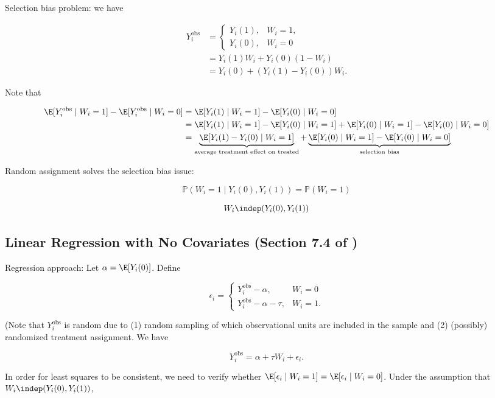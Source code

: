 Selection bias problem: we have

\begin{align*}
Y_i^{\text{obs}} & = \begin{cases}Y_i(1), & W_i = 1, \\ Y_i(0), & W_i = 0 \end{cases}
\\ & = Y_i(1) W_i + Y_i(0) (1 - W_i) 
\\ & = Y_i(0) + (Y_i(1) - Y_i(0)) W_i.
\end{align*}

Note that

\begin{align*}
\E[Y_i^{\text{obs}} \mid W_i = 1] -  \E[Y_i^{\text{obs}} \mid W_i = 0] &  =   \E[Y_i(1)  \mid W_i = 1] -  \E[Y_i(0) \mid W_i = 0] 
\\ &  =   \E[Y_i(1)  \mid W_i = 1] - \E[Y_i(0)  \mid W_i = 1]  + \E[Y_i(0)  \mid W_i = 1]  -  \E[Y_i(0) \mid W_i = 0] 
\\ &  =  \underbrace{\E[Y_i(1) - Y_i(0) \mid W_i = 1] }_{\text{average treatment effect on treated}} +  \underbrace{ \E[Y_i(0) \mid W_i = 1]  -  \E[Y_i(0) \mid W_i = 0]}_{\text{selection bias}} 
\end{align*}

Random assignment solves the selection bias issue:

\[
\mathbb{P}(W_i = 1 \mid Y_i(0), Y_i(1)) = \mathbb{P}(W_i = 1)
\]

\[
W_i \indep (Y_i(0), Y_i(1))
\]

\subsection{Linear Regression with No Covariates (Section 7.4 of \citet{imbens_rubin_2015})}

Regression approach: Let \(\alpha = \E[Y_i(0)]\). Define

\[
\epsilon_i = \begin{cases}
Y_i^{\text{obs}} - \alpha, & W_i = 0\\
Y_i^{\text{obs}} - \alpha - \tau, & W_i = 1.
\end{cases}
\]

(Note that \(Y_i^{\text{obs}}\) is random due to (1) random sampling of which observational units are included in the sample and (2) (possibly) randomized treatment assignment. We have

\[
Y_i^{\text{obs}} = \alpha + \tau W_i + \epsilon_i.
\]

In order for least squares to be consistent, we need to verify whether \(\E[\epsilon_i \mid W_i = 1] = \E[\epsilon_i \mid W_i = 0]\). Under the assumption that \(W_i \indep (Y_i(0), Y_i(1))\),

